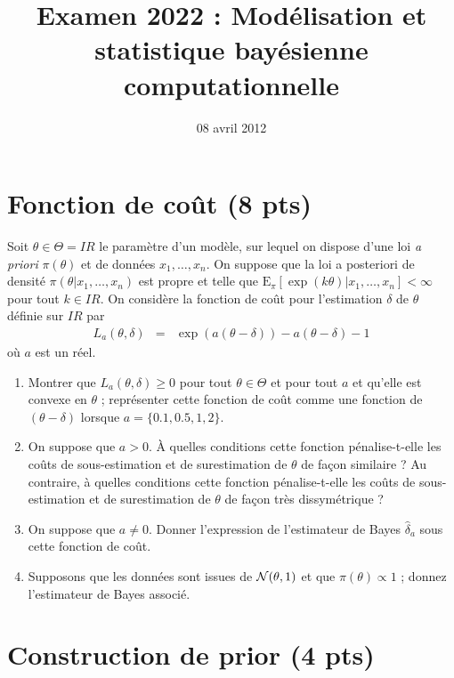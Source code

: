 \documentclass[10pt]{article}
\title{Examen  2022 : Mod\'elisation et statistique bay\'esienne computationnelle }
\date{08 avril 2012}
\newcommand{\R}{I\!\!R}
\newcommand{\E}{\mbox{E}}
\newcommand{\1}{\mathbbm{1}}
\begin{document}
\maketitle

 

\section{Fonction de co\^ut (8 pts) }

Soit $\theta\in\Theta=\R$ le param\`etre d'un mod\`ele, sur lequel on dispose d'une loi {\it a priori} $\pi(\theta)$ et de donn\'ees $x_1,\ldots,x_n$. On suppose que la loi a posteriori de densit\'e  $\pi(\theta|x_1,\ldots,x_n)$ est propre et telle que $\E_{\pi}[\exp(k\theta)|x_1,\ldots,x_n]<\infty$ pour tout $k\in\R$. On consid\`ere la fonction de co\^ut pour l'estimation $\delta$ de $\theta$ d\'efinie sur $\R$ par
\begin{eqnarray*}
L_a(\theta,\delta) & = & \exp(a(\theta-\delta)) - a(\theta-\delta) - 1
\end{eqnarray*}
o\`u $a$ est un r\'eel.
\begin{enumerate}
\item Montrer que $L_a(\theta,\delta)\geq 0$ pour tout $\theta\in\Theta$ et pour tout $a$ et qu'elle est convexe en $\theta$ ; repr\'esenter cette fonction de co\^ut comme une fonction de $(\theta-\delta)$ lorsque $a=\{0.1, 0.5, 1,2\}$. 
\item On suppose que $a>0$. \`A quelles conditions cette fonction p\'enalise-t-elle les co\^uts de sous-estimation et de surestimation de $\theta$ de fa\c con similaire ? Au contraire, \`a quelles conditions cette fonction p\'enalise-t-elle les co\^uts de sous-estimation et de surestimation de $\theta$ de fa\c con tr\`es dissym\'etrique ? 
\item On suppose que $a\neq 0$. Donner l'expression de l'estimateur de Bayes $\hat{\delta}_a$ sous cette fonction de co\^ut.
\item Supposons que les donn\'ees sont issues de ${\cal{N}}(\theta,1)$ et que $\pi(\theta)\propto 1$ ; donnez l'estimateur de Bayes associ\'e.
\end{enumerate}


\section{Construction de prior (4 pts)}
\end{document}
